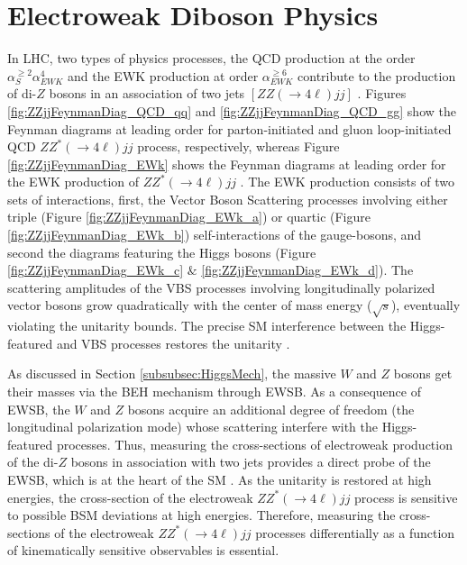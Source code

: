 \section{ Electroweak Diboson Physics } 
\label{sec:EWKPheno}

In LHC, two types of physics processes, the QCD production at the order $\alpha_{S}^{\geq 2} \alpha_{EWK}^{4}$ and the EWK production at order $\alpha_{EWK}^{\geq6}$ contribute to the production of di-$Z$ bosons in an association of two jets $[ ZZ( \rightarrow 4\ell) jj ]$ \cite{CMSRun2ZZjj}. Figures \ref{fig:ZZjjFeynmanDiag_QCD_qq} and \ref{fig:ZZjjFeynmanDiag_QCD_gg} show the Feynman diagrams at leading order for parton-initiated and gluon loop-initiated QCD $ZZ^*(\rightarrow 4\ell) jj$ process, respectively, whereas Figure \ref{fig:ZZjjFeynmanDiag_EWk} shows the Feynman diagrams at leading order for the EWK production of $ZZ^*(\rightarrow 4\ell) jj$ \cite{PowhegV2ZZjj}. The EWK production consists of two sets of interactions, first, the Vector Boson Scattering processes involving either triple (Figure \ref{fig:ZZjjFeynmanDiag_EWk_a}) or quartic (Figure \ref{fig:ZZjjFeynmanDiag_EWk_b}) self-interactions of the gauge-bosons, and second the diagrams featuring the Higgs bosons (Figure \ref{fig:ZZjjFeynmanDiag_EWk_c} $\&$ \ref{fig:ZZjjFeynmanDiag_EWk_d}). The scattering amplitudes of the VBS processes involving longitudinally polarized vector bosons grow quadratically with the center of mass energy ($\sqrt{s}$), eventually violating the unitarity bounds. The precise SM interference between the Higgs-featured and VBS processes restores the unitarity \cite{VBSWWWW}.

As discussed in Section \ref{subsubsec:HiggsMech}, the massive $W$ and $Z$ bosons get their masses via the BEH mechanism through EWSB. As a consequence of EWSB, the $W$ and $Z$ bosons acquire an additional degree of freedom (the longitudinal polarization mode) whose scattering interfere with the Higgs-featured processes. Thus, measuring the cross-sections of electroweak production of the di-$Z$ bosons in association with two jets provides a direct probe of the EWSB, which is at the heart of the SM \cite{CMSRun2ZZjj}. As the unitarity is restored at high energies, the cross-section of the electroweak $ZZ^*(\rightarrow 4\ell) jj$ process is sensitive to possible BSM deviations at high energies. Therefore, measuring the cross-sections of the electroweak $ZZ^*(\rightarrow 4\ell) jj$ processes differentially as a function of kinematically sensitive observables is essential. 

